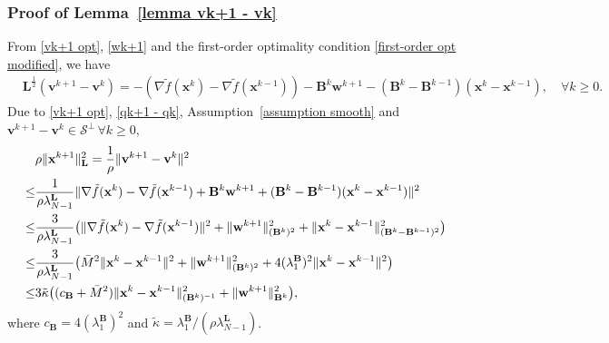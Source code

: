 \documentclass[10pt,a4paper]{amsart}
\begin{document}
\subsubsection{Proof of Lemma~\ref{lemma vk+1 - vk}}\label{proof lemma vk+1 - vk}
From \eqref{vk+1 opt}, \eqref{wk+1} and the first-order optimality condition \eqref{first-order opt modified}, we have
\vspace{-0.2cm}
\begin{align}
	&\mathbf{L}^{\frac{1}{2}}(\mathbf{v}^{k+1}-\mathbf{v}^k)=-(\nabla \tilde{f}(\mathbf{x}^k)-\nabla \tilde{f}(\mathbf{x}^{k-1}))-\mathbf{B}^k\mathbf{w}^{k+1}-(\mathbf{B}^{k}-\mathbf{B}^{k-1})(\mathbf{x}^k-\mathbf{x}^{k-1}), \quad \forall k \geq 0.\label{qk+1 - qk}
\end{align}
Due to \eqref{vk+1 opt}, \eqref{qk+1 - qk}, Assumption~\ref{assumption smooth} and $\mathbf{v}^{k+1}-\mathbf{v}^k \in \mathcal{S}^{{\perp}} \,\forall k\geq 0$,
\vspace{-0.2cm}
\begin{align}
	&\rho\|\mathbf{x}^{k+1}\|^2_{\mathbf{L}}=\frac{1}{\rho}\|\mathbf{v}^{k+1}-\mathbf{v}^k\|^2\notag \\ 
    \leq& \frac{1}{\rho\lambda_{N-1}^{\mathbf{L}}}\|\nabla \tilde{f}(\mathbf{x}^k)-\nabla \tilde{f}(\mathbf{x}^{k-1})+\mathbf{B}^k\mathbf{w}^{k+1}+(\mathbf{B}^{k}-\mathbf{B}^{k-1})(\mathbf{x}^k-\mathbf{x}^{k-1})\|^2  \notag \\
	\leq &\frac{3}{\rho\lambda_{N-1}^{\mathbf{L}}}\big(\|\nabla \tilde{f}(\mathbf{x}^k)-\nabla \tilde{f}(\mathbf{x}^{k-1})\|^2+\|\mathbf{w}^{k+1}\|^2_{(\mathbf{B}^k)^2}+ \|\mathbf{x}^k-\mathbf{x}^{k-1}\|^2_{(\mathbf{B}^{k}-\mathbf{B}^{k-1})^2}\big) \notag\\
	\leq & \frac{3}{\rho\lambda_{N-1}^{\mathbf{L}}}\big(\bar{M}^2\|\mathbf{x}^k-\mathbf{x}^{k-1}\|^2+\|\mathbf{w}^{k+1}\|^2_{(\mathbf{B}^k)^2}+ 4(\lambda_1^\mathbf{B})^2\|\mathbf{x}^k-\mathbf{x}^{k-1}\|^2\big) \notag\\
	\leq &3\tilde{\kappa} \big((c_{\mathbf{B}}+\bar{M}^2)\|\mathbf{x}^k-\mathbf{x}^{k-1}\|^2_{(\mathbf{B}^{k})^{-1}}+\|\mathbf{w}^{k+1}\|^2_{\mathbf{B}^k}\big), \label{rho xk+1 leq 3 tildekappa}
\end{align}
where $c_{\mathbf{B}}=4(\lambda_1^\mathbf{B})^2$ and $\tilde{\kappa} = {\lambda_1^{\mathbf{B}}}/({\rho \lambda_{N-1}^{\mathbf{L}}})$. 
\end{document}
